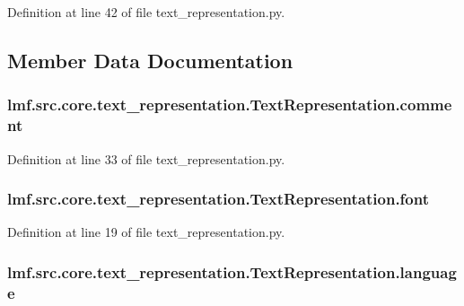 Definition at line 42 of file text\+\_\+representation.\+py.



\subsection{Member Data Documentation}
\hypertarget{classlmf_1_1src_1_1core_1_1text__representation_1_1_text_representation_af0026ed9d19dd869b408fba84f6fa5b1}{
\subsubsection[{comment}]{\setlength{\rightskip}{0pt plus 5cm}lmf.\+src.\+core.\+text\+\_\+representation.\+Text\+Representation.\+comment}}\label{classlmf_1_1src_1_1core_1_1text__representation_1_1_text_representation_af0026ed9d19dd869b408fba84f6fa5b1}


Definition at line 33 of file text\+\_\+representation.\+py.

\hypertarget{classlmf_1_1src_1_1core_1_1text__representation_1_1_text_representation_a78df11b119c24be8b18e6f121e0bb802}{
\subsubsection[{font}]{\setlength{\rightskip}{0pt plus 5cm}lmf.\+src.\+core.\+text\+\_\+representation.\+Text\+Representation.\+font}}\label{classlmf_1_1src_1_1core_1_1text__representation_1_1_text_representation_a78df11b119c24be8b18e6f121e0bb802}


Definition at line 19 of file text\+\_\+representation.\+py.

\hypertarget{classlmf_1_1src_1_1core_1_1text__representation_1_1_text_representation_aba23f79743bc4aa642f344aec09a3807}{
\subsubsection[{language}]{\setlength{\rightskip}{0pt plus 5cm}lmf.\+src.\+core.\+text\+\_\+representation.\+Text\+Representation.\+language}}\label{classlmf_1_1src_1_1core_1_1text__representation_1_1_text_representation_aba23f79743bc4aa642f344aec09a3807}


